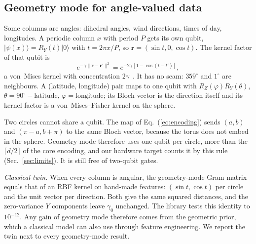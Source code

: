 \documentclass[aps,pra,reprint,superscriptaddress,nofootinbib,longbibliography]{revtex4-2}
\newcommand{\ket}[1]{\lvert #1 \rangle}
\begin{document}
\subsection{Geometry mode for angle-valued data}
\label{sec:geometry}
Some columns are angles: dihedral angles, wind directions, times of day, longitudes. A periodic column $x$ with period
$P$ gets its own qubit, $\ket{\psi(x)} = R_Y(t)\ket{0}$ with $t = 2\pi x/P$, so $\mathbf{r} = (\sin t, 0, \cos t)$.
The kernel factor of that qubit is
\begin{equation}
e^{-\gamma \lVert \mathbf{r} - \mathbf{r}' \rVert^2} = e^{-2\gamma\, [1 - \cos(t - t')]},
\end{equation}
a von~Mises kernel with concentration $2\gamma$~\cite{sra2016directional,pewsey2020recent}. It has no seam: $359^\circ$
and $1^\circ$ are neighbours. A (latitude, longitude) pair maps to one qubit with $R_Z(\varphi) R_Y(\theta)$,
$\theta = 90^\circ - \text{latitude}$, $\varphi = \text{longitude}$; its Bloch vector is the direction itself and its
kernel factor is a von~Mises--Fisher kernel on the sphere.

Two circles cannot share a qubit. The map of Eq.~(\ref{eq:encoding}) sends $(a, b)$ and $(\pi - a, b + \pi)$ to the same
Bloch vector, because the torus does not embed in the sphere. Geometry mode therefore uses one qubit per circle, more
than the $\lceil d/2 \rceil$ of the core encoding, and our hardware target counts it by this rule
(Sec.~\ref{sec:limits}). It is still free of two-qubit gates.

\textit{Classical twin.} When every column is angular, the geometry-mode Gram matrix equals that of an RBF kernel on
hand-made features: $(\sin t, \cos t)$ per circle and the unit vector per direction. Both give the same squared
distances, and the zero-variance $Y$ components leave $\gamma_0$ unchanged. The library tests this identity to
$10^{-12}$. Any gain of geometry mode therefore comes from the geometric prior, which a classical model can also use through
feature engineering. We report the twin next to every geometry-mode result.
\end{document}
